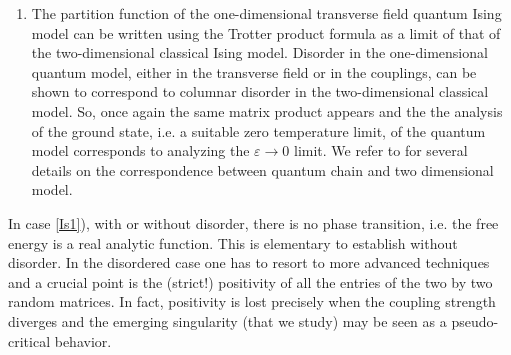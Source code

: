 \documentclass[reqno,11pt]{amsart}
\numberwithin{equation}{section}
\newcommand{\gep}{\varepsilon}       %
\begin{document}
\begin{enumerate}[start=1,label={(I\arabic*)},leftmargin=*]
\item 	\label{Is3}
	The partition function of the  one-dimensional  transverse field  quantum Ising model can be written using the Trotter product formula as a limit of that of the two-dimensional classical Ising model. Disorder in the one-dimensional quantum model, either in the transverse field or in the couplings, can be shown to correspond to columnar disorder in the two-dimensional classical model.
	So, once again the same matrix product appears and the
	 the analysis of the ground state, i.e. a suitable zero temperature limit,  of the  quantum model corresponds to analyzing the $\gep\to 0$ limit. We refer to 
	 \cite{cf:Luck,cf:Fisher} for several details on the correspondence between quantum chain and two dimensional model. 
\end{enumerate}

\smallskip 

In case  \ref{Is1}), with or without disorder,  there is no phase transition, i.e. the free energy is a real analytic function. This is elementary to establish without disorder. In the disordered case one has to resort to more advanced techniques 
  \cite{cf:Ruelle} and a crucial point is the (strict!) positivity of all the entries of the two by two random matrices. In fact, positivity is lost precisely 
   when the coupling strength diverges and the emerging singularity (that we study) may be seen as a pseudo-critical behavior. 

\end{document}

